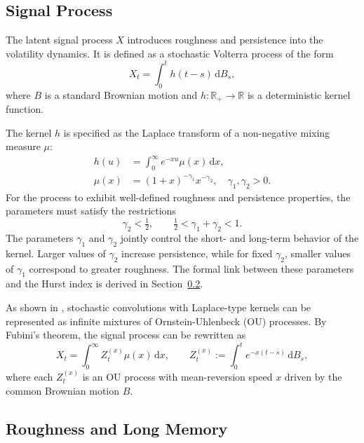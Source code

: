 \subsection{Signal Process} \label{subsec:SignalProcess}

The latent signal process $X$ introduces roughness and persistence into the volatility dynamics. It is defined as a stochastic Volterra process \citep{AbiJaberLarssonPulido2019} of the form
\begin{equation} \label{eq:StochInt}
    X_t = \int_0^t h(t-s) \, \mathrm{d}B_s,
\end{equation}
where $B$ is a standard Brownian motion and $h: \mathbb{R}_+ \to \mathbb{R}$ is a deterministic kernel function.

The kernel $h$ is specified as the Laplace transform of a non-negative mixing measure $\mu$:
\begin{align}
    h(u) &= \int_0^\infty e^{-x u} \mu(x) \,\mathrm{d}x, \label{eq:Kernel}\\
    \mu(x) &= (1+x)^{-\gamma_1} x^{-\gamma_2}, \quad 
    \gamma_1, \gamma_2 > 0. \label{eq:Measure}
\end{align}
For the process to exhibit well-defined roughness and persistence properties, the parameters must satisfy the restrictions
\begin{equation} \label{eq:Restrictions}
    \gamma_2 < \tfrac{1}{2}, 
    \qquad 
    \tfrac{1}{2} < \gamma_1 + \gamma_2 < 1.
\end{equation}
The parameters $\gamma_1$ and $\gamma_2$ jointly control the short- and long-term behavior of the kernel. Larger values of $\gamma_2$ increase persistence, while for fixed $\gamma_2$, smaller values of $\gamma_1$ correspond to greater roughness. The formal link between these parameters and the Hurst index is derived in Section~\ref{subsec:RoughnessLongMemory}.
 
As shown in \citet{CarmonaCoutin1998}, stochastic convolutions with Laplace-type kernels can be represented as infinite mixtures of Ornstein-Uhlenbeck (OU) processes. By Fubini's theorem, the signal process can be rewritten as
\begin{equation} \label{eq:Signal}
    X_t = \int_0^\infty Z_t^{(x)} \mu(x) \,\mathrm{d}x, 
    \qquad 
    Z_t^{(x)} := \int_0^t e^{-x(t-s)} \,\mathrm{d}B_s,
\end{equation}
where each $Z_t^{(x)}$ is an OU process with mean-reversion speed $x$ driven by the common Brownian motion $B$.


\subsection{Roughness and Long Memory} \label{subsec:RoughnessLongMemory}

